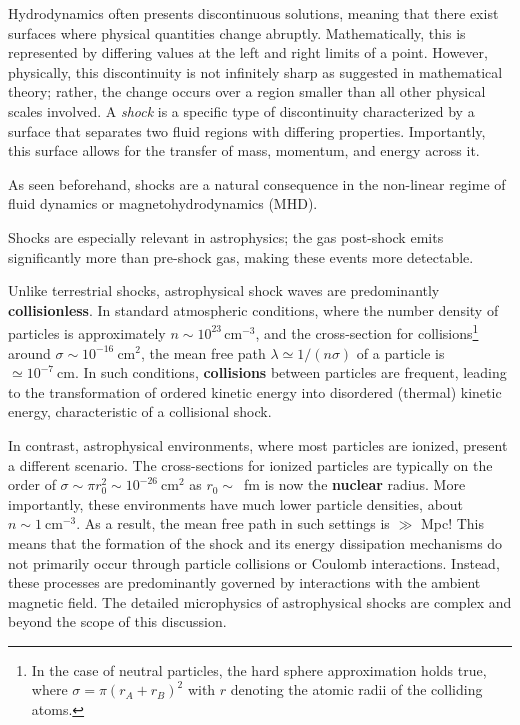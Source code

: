 Hydrodynamics often presents discontinuous solutions, meaning that there exist surfaces where physical quantities change abruptly. Mathematically, this is represented by differing values at the left and right limits of a point. However, physically, this discontinuity is not infinitely sharp as suggested in mathematical theory; rather, the change occurs over a region smaller than all other physical scales involved. 
%
A \emph{shock} is a specific type of discontinuity characterized by a surface that separates two fluid regions with differing properties. Importantly, this surface allows for the transfer of mass, momentum, and energy across it.

As seen beforehand, shocks are a natural consequence in the non-linear regime of fluid dynamics or magnetohydrodynamics (MHD).

Shocks are especially relevant in astrophysics; the gas post-shock emits significantly more than pre-shock gas, making these events more detectable.

Unlike terrestrial shocks, astrophysical shock waves are predominantly \textbf{collisionless}. 
%
In standard atmospheric conditions, where the number density of particles is approximately \( n \sim 10^{23} \, \text{cm}^{-3} \), and the cross-section for collisions\footnote{In the case of neutral particles, the hard sphere approximation holds true, where \( \sigma = \pi (r_A + r_B)^2 \) with \( r \) denoting the atomic radii of the colliding atoms.} around \( \sigma \sim 10^{-16}~\text{cm}^2 \), the mean free path \( \lambda \simeq 1 / (n \sigma) \) of a particle is \( \simeq 10^{-7}~\text{cm} \). 
%
In such conditions, \textbf{collisions} between particles are frequent, leading to the transformation of ordered kinetic energy into disordered (thermal) kinetic energy, characteristic of a collisional shock.

In contrast, astrophysical environments, where most particles are ionized, present a different scenario. The cross-sections for ionized particles are typically on the order of \( \sigma \sim \pi r_0^2 \sim 10^{-26}~\text{cm}^2 \) as $r_0 \sim$~fm is now the \textbf{nuclear} radius.
%
More importantly, these environments have much lower particle densities, about \( n \sim 1~\text{cm}^{-3} \). As a result, the mean free path in such settings is \( \gg \) Mpc! 
%
This means that the formation of the shock and its energy dissipation mechanisms do not primarily occur through particle collisions or Coulomb interactions. Instead, these processes are predominantly governed by interactions with the ambient magnetic field. The detailed microphysics of astrophysical shocks are complex and beyond the scope of this discussion.

